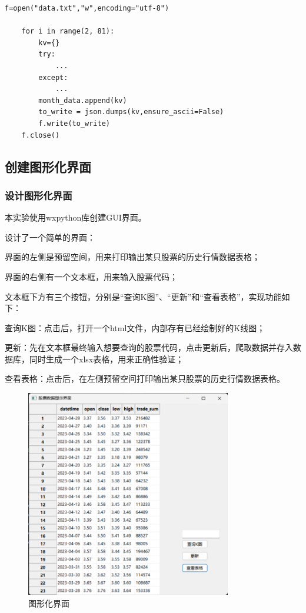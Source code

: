 \documentclass[UTF8,12pt]{article}
\begin{document}
\begin{lstlisting}[title=txt文件存储,frame=shadowbox]
    f=open("data.txt","w",encoding="utf-8")

    for i in range(2, 81):
        kv={}
        try:
            ...
        except:
            ...
        month_data.append(kv)
        to_write = json.dumps(kv,ensure_ascii=False)
        f.write(to_write)
    f.close()
\end{lstlisting}

\subsection{创建图形化界面}
\subsubsection{设计图形化界面}
本实验使用wxpython库创建GUI界面。

设计了一个简单的界面：

界面的左侧是预留空间，用来打印输出某只股票的历史行情数据表格；

界面的右侧有一个文本框，用来输入股票代码；

文本框下方有三个按钮，分别是“查询K图”、“更新”和“查看表格”，实现功能如下：

查询K图：点击后，打开一个html文件，内部存有已经绘制好的K线图；

更新：先在文本框最终输入想要查询的股票代码，点击更新后，爬取数据并存入数据库，同时生成一个xlsx表格，用来正确性验证；

查看表格：点击后，在左侧预留空间打印输出某只股票的历史行情数据表格。

\begin{figure}[htbp]
    \centering
    \includegraphics[width=0.8\textwidth]{img/8.png}
    \caption{图形化界面}
\end{figure}
\end{document}
